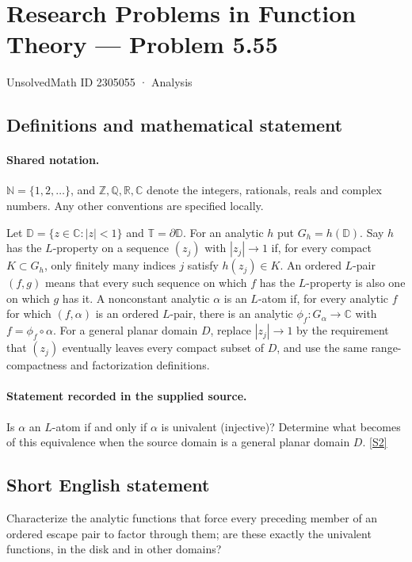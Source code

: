 \documentclass[11pt]{book}
\newcommand{\sref}[2]{\hyperlink{source:#1:#2}{[S#2]}}
\begin{document}
\setcounter{section}{2305054}
\section{Research Problems in Function Theory — Problem 5.55}\label{2305055}
{\small\sffamily UnsolvedMath ID 2305055 · Analysis}
\subsection{Definitions and mathematical statement}

\paragraph{Shared notation.}$\mathbb N=\{1,2,\ldots\}$, and $\mathbb Z,\mathbb Q,\mathbb R,\mathbb C$ denote the integers, rationals, reals and complex numbers. Any other conventions are specified locally.


Let $\mathbb D=\{z\in\mathbb C:|z|<1\}$ and $\mathbb T=\partial\mathbb D$. For an analytic $h$ put $G_h=h(\mathbb D)$. Say $h$ has the $L$-property on a sequence $(z_j)$ with $|z_j|\to1$ if, for every compact $K\subset G_h$, only finitely many indices $j$ satisfy $h(z_j)\in K$. An ordered $L$-pair $(f,g)$ means that every such sequence on which $f$ has the $L$-property is also one on which $g$ has it. A nonconstant analytic $\alpha$ is an $L$-atom if, for every analytic $f$ for which $(f,\alpha)$ is an ordered $L$-pair, there is an analytic $\phi_f:G_\alpha\to\mathbb C$ with $f=\phi_f\circ\alpha$. For a general planar domain $D$, replace $|z_j|\to1$ by the requirement that $(z_j)$ eventually leaves every compact subset of $D$, and use the same range-compactness and factorization definitions.
\paragraph{Statement recorded in the supplied source.}
Is $\alpha$ an $L$-atom if and only if $\alpha$ is univalent (injective)? Determine what becomes of this equivalence when the source domain is a general planar domain $D$. \sref{2305055}{2}
\subsection{Short English statement}
Characterize the analytic functions that force every preceding member of an ordered escape pair to factor through them; are these exactly the univalent functions, in the disk and in other domains?
\end{document}
